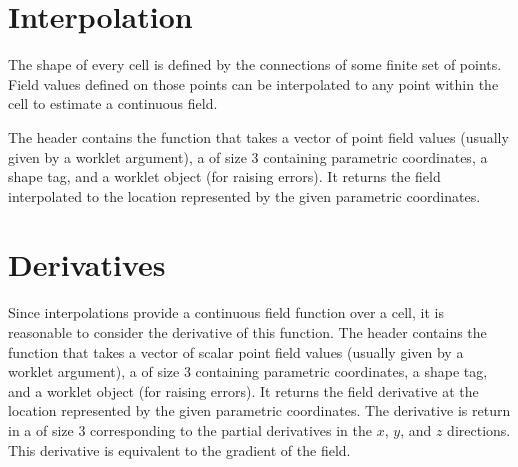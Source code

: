 
\section{Interpolation}


The shape of every cell is defined by the connections of some finite set of
points. Field values defined on those points can be interpolated to any
point within the cell to estimate a continuous field.

The  header contains the function
 that takes a vector of point field values
(usually given by a  worklet argument), a 
of size 3 containing parametric coordinates, a shape tag, and a worklet
object (for raising errors). It returns the field interpolated to the
location represented by the given parametric coordinates.



\section{Derivatives}


Since interpolations provide a continuous field function over a cell, it is
reasonable to consider the derivative of this function. The
 header contains the function
 that takes a vector of scalar point field values
(usually given by a  worklet argument), a 
of size 3 containing parametric coordinates, a shape tag, and a worklet
object (for raising errors). It returns the field derivative at the
location represented by the given parametric coordinates. The derivative is
return in a  of size 3 corresponding to the partial derivatives
in the $x$, $y$, and $z$ directions. This derivative is equivalent to the
gradient of the field.


